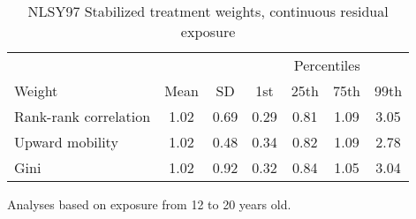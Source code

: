 \begin{table}[htp]
\centering
\footnotesize
\setlength{\tabcolsep}{10pt}
\renewcommand{\arraystretch}{1}
\begin{threeparttable}
\centering
\caption{NLSY97 Stabilized treatment weights, continuous residual exposure} 
\label{tab:nlsy97_ipt_weigths_zr}
\begin{tabular}{lcccccc}
  \hline
\multicolumn{3}{c}{} & \multicolumn{4}{c}{Percentiles} \\ 
 \cmidrule{4-7} 
Weight & Mean & SD & 1st & 25th & 75th & 99th \\ 
  \hline
Rank-rank correlation & 1.02 & 0.69 & 0.29 & 0.81 & 1.09 & 3.05 \\ 
  Upward mobility & 1.02 & 0.48 & 0.34 & 0.82 & 1.09 & 2.78 \\ 
  Gini & 1.02 & 0.92 & 0.32 & 0.84 & 1.05 & 3.04 \\ 
   \hline
\end{tabular}
\begin{tablenotes}
\footnotesize
\item Analyses based on exposure from 12 to 20 years old. 
\end{tablenotes}
\end{threeparttable}
\end{table}
